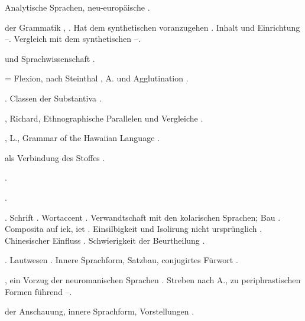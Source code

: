 \begin{register}
Analytische Sprachen, neu-europäische \pageref{sp.393}.


 der Grammatik \pageref{sp.85}, \pageref{sp.88}. Hat dem synthetischen voranzugehen \pageref{sp.86}. Inhalt und Einrichtung \pageref{sp.88}–\pageref{sp.93}. Vergleich mit dem synthetischen \pageref{sp.93}–\pageref{sp.94}.

 und Sprachwissenschaft \pageref{sp.15}.

 = Flexion, nach Steinthal \pageref{sp.337}, A. und Agglutination \pageref{sp.351}.

. Classen der Substantiva \pageref{sp.442}.

, Richard, Ethnographische Parallelen und Vergleiche \pageref{sp.148}.

, L., Grammar of the Hawaiian Language \pageref{sp.463}.

 als Verbindung des Stoffes \pageref{sp.324}.


.

.

. Schrift \pageref{sp.129}. Wortaccent \pageref{sp.148}. Verwandtschaft mit den kolarischen Sprachen; Bau \pageref{sp.150}. Composita auf iek, iet \pageref{sp.223}.  Einsilbigkeit und Isolirung nicht ursprünglich \pageref{sp.255}. Chinesischer Einfluss \pageref{sp.271}.  Schwierigkeit der Beurtheilung \pageref{sp.426}. 

. Lautwesen \pageref{sp.34}. Innere Sprachform, Satzbau, conjugirtes Fürwort \pageref{sp.151}. 



, ein Vorzug der neuromanischen Sprachen \pageref{sp.183}.  Streben nach A., zu periphrastischen Formen führend \pageref{sp.239}–\pageref{sp.241}.

 der Anschauung, innere Sprachform, Vorstellungen \pageref{sp.335}.


\end{register}
